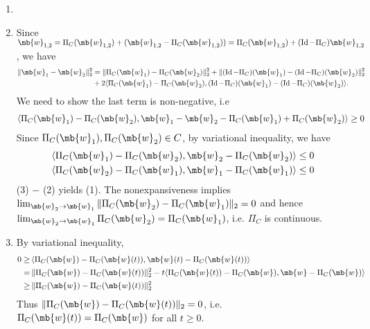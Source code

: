 \begin{exercise}
\begin{enumerate}
      \begin{solution}
        \begin{enumerate}
          \item []
          \item 
            Since $\mb{w}_{1,2}= \Pi_C(\mb{w}_{1,2})+(\mb{w}_{1,2}-\Pi_C(\mb{w}_{1,2})) = \Pi_C(\mb{w}_{1,2})+(\Id-\Pi_C)\mb{w}_{1,2} $, we have
            \begin{align*}
              \|\mb{w}_1-\mb{w}_2\|_2^2 & = \|\Pi_C(\mb{w}_1)-\Pi_C(\mb{w}_2)\|_2^2 + \|(\Id-\Pi_C)(\mb{w}_1)-(\Id-\Pi_C)(\mb{w}_2)\|_2^2  \\ 
                                        & + 2\langle\Pi_C(\mb{w}_1)-\Pi_C(\mb{w}_2), (\Id-\Pi_C)(\mb{w}_1)-(\Id-\Pi_C)(\mb{w}_2) \rangle.
            \end{align*}
            We need to show the last term is non-negative, i.e
            \begin{align}
              \langle\Pi_C(\mb{w}_1)-\Pi_C(\mb{w}_2), \mb{w}_1-\mb{w}_2 - \Pi_C(\mb{w}_1) + \Pi_C(\mb{w}_2) \rangle \ge 0 
            \end{align}
            Since $\Pi_C(\mb{w}_1),\Pi_C(\mb{w}_2)\in C$, by variational inequality, we have
            \begin{align}
              \langle\Pi_C(\mb{w}_1)-\Pi_C(\mb{w}_2), \mb{w}_2 - \Pi_C(\mb{w}_2) \rangle \le 0 \\
              \langle\Pi_C(\mb{w}_2)-\Pi_C(\mb{w}_1), \mb{w}_1 - \Pi_C(\mb{w}_1) \rangle \le 0
            \end{align}
            (3) $-$ (2) yields (1). The nonexpansiveness implies $\lim_{\mb{w}_2\to \mb{w}_1} \|\Pi_C(\mb{w}_2)-\Pi_C(\mb{w}_1)\|_2 = 0$ and hence $\lim_{\mb{w}_2\to \mb{w}_1} \Pi_C(\mb{w}_2) = \Pi_C(\mb{w}_1)$, i.e. $\Pi_C$ is continuous.
          \item By variational inequality,
            \begin{align*}
              0 \ge\, & \langle\Pi_C(\mb{w})-\Pi_C(\mb{w}(t)), \mb{w}(t) - \Pi_C(\mb{w}(t))\rangle                                     \\
              =    \, & \|\Pi_C(\mb{w})-\Pi_C(\mb{w}(t))\|^2_2 - t\langle\Pi_C(\mb{w}(t))-\Pi_C(\mb{w}), \mb{w} - \Pi_C(\mb{w})\rangle \\
              \ge \,  & \|\Pi_C(\mb{w})-\Pi_C(\mb{w}(t))\|^2_2
            \end{align*}
            Thus $\|\Pi_C(\mb{w})-\Pi_C(\mb{w}(t))\|_2 = 0$, i.e. $\Pi_C(\mb{w}(t)) = \Pi_C(\mb{w})$ for all $t \geq 0$.
            \qedhere
        \end{enumerate}
      \end{solution}
      

\end{enumerate}
\end{exercise}
